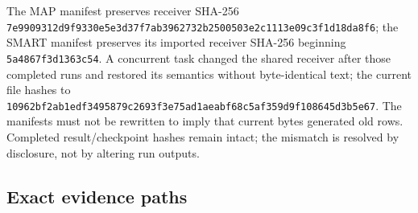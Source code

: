 \documentclass[10pt]{article}
\begin{document}
The MAP manifest preserves receiver SHA-256\\
\texttt{7e990931\allowbreak{}2d9f9330\allowbreak{}e5e3d37f\allowbreak{}7ab39627\allowbreak{}32b25005\allowbreak{}03e2c111\allowbreak{}3e09c3f1\allowbreak{}d18da8f6};
the SMART manifest preserves its imported receiver SHA-256 beginning
\texttt{5a4867f3d1363c54}.  A concurrent task changed the shared receiver after
those completed runs and restored its semantics without byte-identical text;
the current file hashes to
\texttt{10962bf2ab1edf34\allowbreak{}95879c2693f3e75a\allowbreak{}d1aeabf68c5af359\allowbreak{}d9f108645d3b5e67}.
The manifests must not be rewritten to imply that current bytes generated old
rows.  Completed result/checkpoint hashes remain intact; the mismatch is
resolved by disclosure, not by altering run outputs.

\subsection{Exact evidence paths}
\end{document}
